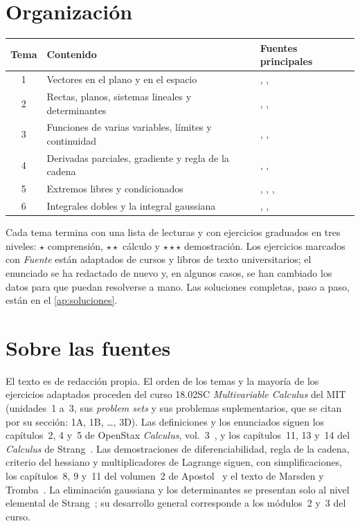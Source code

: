 \documentclass[11pt,a4paper,twoside,openany]{book}
\begin{document}
\section*{Organización}
\begin{center}\small
\begin{tabular}{@{}cll@{}}
\toprule
Tema & Contenido & Fuentes principales \\
\midrule
1 & Vectores en el plano y en el espacio & \cite{mit1802}, \cite{openstax3}, \cite{strangcalc} \\
2 & Rectas, planos, sistemas lineales y determinantes & \cite{mit1802}, \cite{openstax3}, \cite{strangla} \\
3 & Funciones de varias variables, límites y continuidad & \cite{openstax3}, \cite{apostol2}, \cite{marsden} \\
4 & Derivadas parciales, gradiente y regla de la cadena & \cite{mit1802}, \cite{openstax3}, \cite{apostol2} \\
5 & Extremos libres y condicionados & \cite{mit1802}, \cite{openstax3}, \cite{apostol2}, \cite{marsden} \\
6 & Integrales dobles y la integral gaussiana & \cite{mit1802}, \cite{openstax3}, \cite{strangcalc} \\
\bottomrule
\end{tabular}
\end{center}

Cada tema termina con una lista de lecturas y con ejercicios graduados en tres niveles: $\star$ comprensión, $\star\star$ cálculo y $\star\star\star$ demostración. Los ejercicios marcados con \emph{Fuente} están adaptados de cursos y libros de texto universitarios; el enunciado se ha redactado de nuevo y, en algunos casos, se han cambiado los datos para que puedan resolverse a mano. Las soluciones completas, paso a paso, están en el \cref{ap:soluciones}.

\section*{Sobre las fuentes}
El texto es de redacción propia. El orden de los temas y la mayoría de los ejercicios adaptados proceden del curso 18.02SC \emph{Multivariable Calculus} del MIT~\cite{mit1802} (unidades~1 a~3, sus \emph{problem sets} y sus problemas suplementarios, que se citan por su sección: 1A, 1B, \dots, 3D). Las definiciones y los enunciados siguen los capítulos~2, 4 y~5 de OpenStax \emph{Calculus}, vol.~3~\cite{openstax3}, y los capítulos~11, 13 y~14 del \emph{Calculus} de Strang~\cite{strangcalc}. Las demostraciones de diferenciabilidad, regla de la cadena, criterio del hessiano y multiplicadores de Lagrange siguen, con simplificaciones, los capítulos~8, 9 y~11 del volumen~2 de Apostol~\cite{apostol2} y el texto de Marsden y Tromba~\cite{marsden}. La eliminación gaussiana y los determinantes se presentan solo al nivel elemental de Strang~\cite{strangla}; su desarrollo general corresponde a los módulos~2 y~3 del curso.
\end{document}

